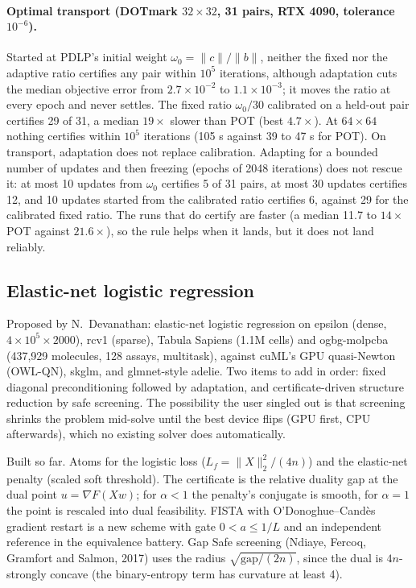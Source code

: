 \paragraph{Optimal transport (DOTmark $32\times32$, 31 pairs, RTX 4090, tolerance $10^{-6}$).}
Started at PDLP's initial weight $\omega_0 = \|c\|/\|b\|$, neither the fixed nor
the adaptive ratio certifies any pair within $10^5$ iterations, although
adaptation cuts the median objective error from $2.7\times10^{-2}$ to
$1.1\times10^{-3}$; it moves the ratio at every epoch and never settles. The
fixed ratio $\omega_0/30$ calibrated on a held-out pair certifies 29 of 31, a
median $19\times$ slower than POT (best $4.7\times$). At $64\times64$ nothing
certifies within $10^5$ iterations (105 s against 39 to 47 s for POT). On
transport, adaptation does not replace calibration.
Adapting for a bounded number of updates and then freezing (epochs of 2048
iterations) does not rescue it: at most 10 updates from $\omega_0$ certifies 5
of 31 pairs, at most 30 updates certifies 12, and 10 updates started from the
calibrated ratio certifies 6, against 29 for the calibrated fixed ratio. The
runs that do certify are faster (a median 11.7 to $14\times$ POT against
$21.6\times$), so the rule helps when it lands, but it does not land reliably.

\subsection{Elastic-net logistic regression}
\label{app:log:logreg}

Proposed by N.~Devanathan: elastic-net logistic regression on epsilon (dense,
$4\times10^5\times2000$), rcv1 (sparse), Tabula Sapiens (1.1M cells) and
ogbg-molpcba (437,929 molecules, 128 assays, multitask), against cuML's GPU
quasi-Newton (OWL-QN), skglm, and glmnet-style adelie. Two items to add in
order: fixed diagonal preconditioning followed by adaptation, and
certificate-driven structure reduction by safe screening. The possibility
the user singled out is that screening shrinks the problem mid-solve until
the best device flips (GPU first, CPU afterwards), which no existing solver
does automatically.

Built so far. Atoms for the logistic loss ($L_f = \|X\|_2^2/(4n)$) and the
elastic-net penalty (scaled soft threshold). The certificate is the relative
duality gap at the dual point $u = \nabla F(Xw)$; for $\alpha<1$ the penalty's
conjugate is smooth, for $\alpha=1$ the point is rescaled into dual
feasibility. FISTA with O'Donoghue--Cand\`es gradient restart is a new scheme
with gate $0 < a \le 1/L$ and an independent reference in the equivalence
battery. Gap Safe screening (Ndiaye, Fercoq, Gramfort and Salmon, 2017)
uses the radius $\sqrt{\mathrm{gap}/(2n)}$, since the dual is $4n$-strongly
concave (the binary-entropy term has curvature at least 4).

